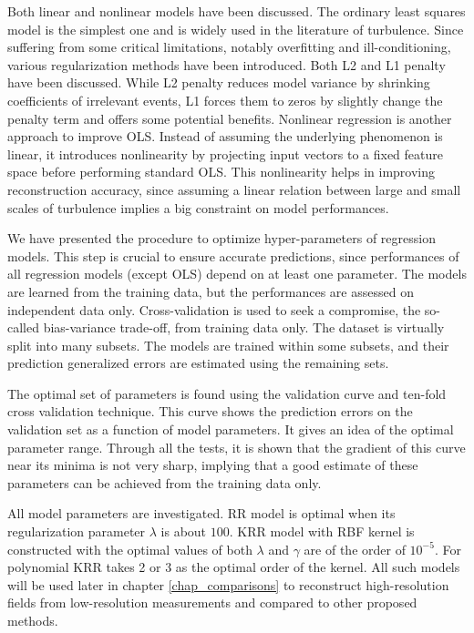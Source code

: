 Both linear and nonlinear models have been discussed. The ordinary least squares model is the simplest one and is widely used in the literature of turbulence. Since suffering from some critical limitations, notably overfitting and ill-conditioning, various regularization methods have been introduced. Both L2 and L1 penalty have been discussed. While L2 penalty reduces model variance by shrinking coefficients of irrelevant events, L1 forces them to zeros by slightly change the penalty term and offers some potential benefits. Nonlinear regression is another approach to improve OLS. Instead of assuming the underlying phenomenon is linear, it introduces nonlinearity by projecting input vectors to a fixed feature space before performing standard OLS. This nonlinearity helps in improving reconstruction accuracy, since assuming a linear relation between large and small scales of turbulence implies a big constraint on model performances. 

We have presented the procedure to optimize hyper-parameters of regression models. This step is crucial to ensure accurate predictions, since performances of all regression models (except OLS) depend on at least one parameter. The models are learned from the training data, but the performances are assessed on independent data only. Cross-validation is used to seek a compromise, the so-called bias-variance trade-off, from training data only. The dataset is virtually split into many subsets. The models are trained within some subsets, and their prediction generalized errors are estimated using the remaining sets. 

The optimal set of parameters is found using the validation curve and ten-fold cross validation technique. This curve shows the prediction errors on the validation set as a function of model parameters. It gives an idea of the optimal parameter range. Through all the tests, it is shown that the gradient of this curve near its minima is not very sharp, implying that a good estimate of these parameters can be achieved from the training data only. 

All model parameters are investigated. RR model is optimal when its regularization parameter $ \lambda $ is about $ 100 $. KRR model with RBF kernel is constructed with the optimal values of both $ \lambda $ and $ \gamma $ are of the order of $ 10^{-5} $. For polynomial KRR takes 2 or 3 as the optimal order of the kernel.
All such models will be used later in chapter \ref{chap_comparisons} to reconstruct high-resolution fields from low-resolution measurements and compared to other proposed methods.